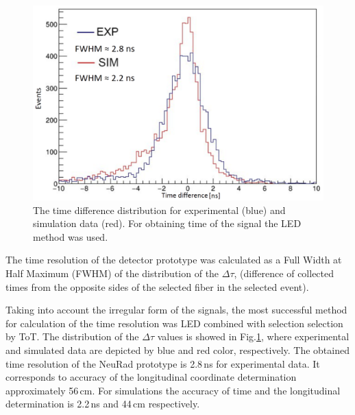 \documentclass{webofc}
\begin{document}
\begin{figure}
	\includegraphics[width=\linewidth]{tausim.png}
	\caption{The time difference distribution for experimental (blue) and simulation data (red). For obtaining time of the signal the LED method was used.}\label{ris:tausim}
\end{figure}
	
The time resolution of the detector prototype was calculated as a Full Width at Half Maximum (FWHM) of the distribution of the $\Delta \tau$, (difference of collected times from the opposite sides of the selected fiber in the selected event).
%
%


Taking into account the irregular form of the signals, the most successful method for calculation of the time resolution was LED combined with selection selection  by ToT.
The distribution of the $\Delta \tau$ values is showed in Fig.\ref{ris:tausim}, where experimental and simulated data are depicted by blue and red color, respectively.
The obtained time resolution of the NeuRad prototype is 2.8\,ns for experimental data. It corresponds to accuracy of the longitudinal coordinate determination approximately 56\,cm. For simulations the accuracy of time and the longitudinal determination is 2.2\,ns and 44\,cm respectively.


	
	
\end{document}
